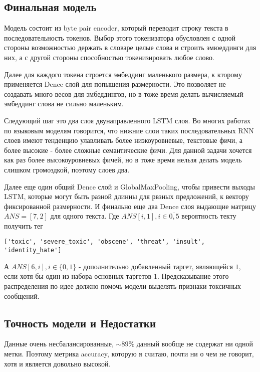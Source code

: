 \documentclass[11pt,a4paper]{article}
\theoremstyle{remark}
\begin{document}
	\subsection*{Финальная модель}
	
	Модель состоит из byte pair encoder, который переводит строку текста в последовательность токенов. Выбор этого токенизатора обусловлен с одной стороны возможностью держать в словаре целые слова и строить эмюеддинги для них, а с другой стороны способностью токенизировать любое слово.
	
	Далее для каждого токена строется эмбеддинг маленького размера, к кторому применяется Dence слой для попышения размерности. Это позволяет не создавать много весов для эмбеддингов, но в тоже время делать вычисляемый эмбеддинг слова не сильно маленьким.
	
	Следующий шаг это два слоя двунаправленного LSTM слоя. Во многих работах по языковым моделям говорится, что нижние слои таких последовательных RNN слоев имеют тенденцию улавливать более низкоуровневые, текстовые фичи, а более высокие - более сложные семантические фичи. Для данной задачи хочется как раз более высокоуровневых фичей, но в тоже время нельзя делать модель слишком громоздкой, поэтому слоев два.
	
	Далее еще один общий Dence слой и GlobalMaxPooling, чтобы привести выходы LSTM, которые могут быть разной длинны для рвзных предложений, к вектору фиксированной размерности. И финально еще два Dence слоя выдающие матрицу $ANS = [7, 2]$ для одного текста. Где $ANS[i, 1], i \in \overline{0, 5}$ вероятность текту получить тег 
	
	\verb|['toxic', 'severe_toxic', 'obscene', 'threat', 'insult', 'identity_hate']|
	
	А $ANS[6, i], i\in \{0, 1\}$ - дополнительно добавленный таргет, являющейся $1$, если хотя бы один из набора основных таргетов $1$. Предсказывание этого распределения по-идее должно помочь модели выделять признаки токсичных сообщений.


	\subsection*{Точность модели и Недостатки}
	
	Данные очень несбалансированные, $\sim 89 \%$ данный вообще не содержат ни одной метки. Поэтому метрика  accuracy, которую я считаю, почти ни о чем не говорит, хотя и является довольно высокой.
	
	
	
\end{document}
